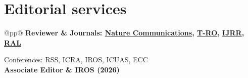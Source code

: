 \documentclass[11pt,a4paper]{article}
\newlength{\colone}
\newlength{\coltwo}
\begin{document}
\section{Editorial services}
\begin{longtable}{@{}p{\colone}p{\coltwo}@{}}
	\bfseries Reviewer
		& Journals: 
			\href{https://www.scimagojr.com/journalsearch.php?q=19700182758&tip=sid}{Nature Communications},
			\href{https://www.scimagojr.com/journalsearch.php?q=95101&tip=sid}{T-RO},
			\href{https://www.scimagojr.com/journalsearch.php?q=18050&tip=sid}{IJRR},
			\href{https://www.scimagojr.com/journalsearch.php?q=21100900379&tip=sid}{RAL} \par
		Conferences: RSS, ICRA, IROS, ICUAS, ECC \\
	\bfseries Associate Editor
		& IROS (2026)
\end{longtable}


\end{document}
